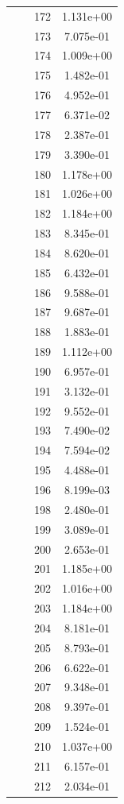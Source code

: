 \documentclass[12pt]{article}
\begin{document}
\begin{longtable}{@{}cccc@{}}
 &  & 172 & 1.131e+00 \\
 &  & 173 & 7.075e-01 \\
 &  & 174 & 1.009e+00 \\
 &  & 175 & 1.482e-01 \\
 &  & 176 & 4.952e-01 \\
 &  & 177 & 6.371e-02 \\
 &  & 178 & 2.387e-01 \\
 &  & 179 & 3.390e-01 \\
 &  & 180 & 1.178e+00 \\
 &  & 181 & 1.026e+00 \\
 &  & 182 & 1.184e+00 \\
 &  & 183 & 8.345e-01 \\
 &  & 184 & 8.620e-01 \\
 &  & 185 & 6.432e-01 \\
 &  & 186 & 9.588e-01 \\
 &  & 187 & 9.687e-01 \\
 &  & 188 & 1.883e-01 \\
 &  & 189 & 1.112e+00 \\
 &  & 190 & 6.957e-01 \\
 &  & 191 & 3.132e-01 \\
 &  & 192 & 9.552e-01 \\
 &  & 193 & 7.490e-02 \\
 &  & 194 & 7.594e-02 \\
 &  & 195 & 4.488e-01 \\
 &  & 196 & 8.199e-03 \\
 &  & 198 & 2.480e-01 \\
 &  & 199 & 3.089e-01 \\
 &  & 200 & 2.653e-01 \\
 &  & 201 & 1.185e+00 \\
 &  & 202 & 1.016e+00 \\
 &  & 203 & 1.184e+00 \\
 &  & 204 & 8.181e-01 \\
 &  & 205 & 8.793e-01 \\
 &  & 206 & 6.622e-01 \\
 &  & 207 & 9.348e-01 \\
 &  & 208 & 9.397e-01 \\
 &  & 209 & 1.524e-01 \\
 &  & 210 & 1.037e+00 \\
 &  & 211 & 6.157e-01 \\
 &  & 212 & 2.034e-01 \\

\end{longtable}
\end{document}
